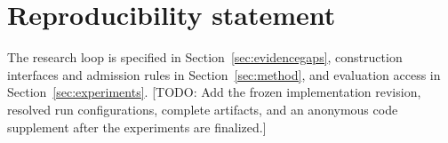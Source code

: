 \documentclass{article}
\newcommand{\todo}[1]{\textcolor{red!65!black}{[TODO: #1]}}
\begin{document}
\section*{Reproducibility statement}
The research loop is specified in Section~\ref{sec:evidencegaps}, construction interfaces and admission rules in Section~\ref{sec:method}, and evaluation access in Section~\ref{sec:experiments}. \todo{Add the frozen implementation revision, resolved run configurations, complete artifacts, and an anonymous code supplement after the experiments are finalized.}




\clearpage
\appendix

\end{document}
